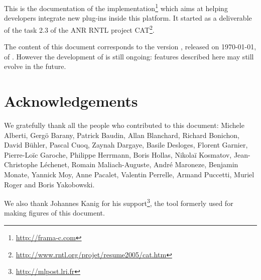 \documentclass[web,svgnames]{frama-c-book}
\begin{document}
This is the documentation of the \framac
implementation\footnote{\url{http://frama-c.com}} which aims at
helping developers integrate new plug-ins inside this platform. It started as
a deliverable of the task 2.3 of the ANR RNTL project
CAT\footnote{\url{http://www.rntl.org/projet/resume2005/cat.htm}}.

The content of this document corresponds to the version \framacversion,
released on \today,
of \framac. However the development of \framac is still ongoing: features
described here may still evolve in the future.

\section*{Acknowledgements}

We gratefully thank all the people who contributed to this document:
Michele Alberti,
Gergö Barany,
Patrick Baudin,
Allan Blanchard,
Richard Bonichon,
David B\"uhler,
Pascal Cuoq,
Zaynah Dargaye,
Basile Desloges,
Florent Garnier,
Pierre-Loïc Garoche,
Philippe Herrmann,
Boris Hollas,
Nikolaï Kosmatov,
Jean-Christophe Léchenet,
Romain Maliach-Auguste,
André Maroneze,
Benjamin Monate,
Yannick Moy,
Anne Pacalet,
Valentin Perrelle,
Armand Puccetti,
Muriel Roger and
Boris Yakobowski.

We also thank Johannes Kanig for his 
support\footnote{\url{http://mlpost.lri.fr}}, the tool formerly used for
making figures of this document.



%






\appendix




\cleardoublepage
{}
{}




\cleardoublepage
{}
{}
\listoffigures


\cleardoublepage
{}
{}
\printindex

\end{document}
